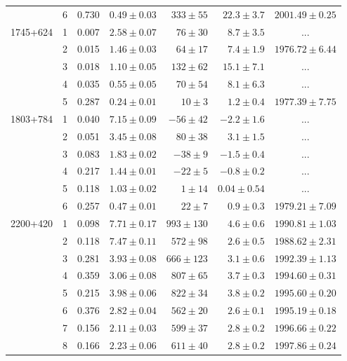 \begin{table}[tbh!]
\begin{SingleSpace}
\begin{tabular}{l c r r r r c}
         &  6 &  0.730 & $ 0.49\pm 0.03$ & $ 333\pm  55$ & $ 22.3\pm 3.7$ & $2001.49\pm   0.25$ \\
1745+624 &  1 &  0.007 & $ 2.58\pm 0.07$ & $  76\pm  30$ & $  8.7\pm 3.5$ & ... \\
         &  2 &  0.015 & $ 1.46\pm 0.03$ & $  64\pm  17$ & $  7.4\pm 1.9$ & $1976.72\pm   6.44$ \\
         &  3 &  0.018 & $ 1.10\pm 0.05$ & $ 132\pm  62$ & $ 15.1\pm 7.1$ & ... \\
         &  4 &  0.035 & $ 0.55\pm 0.05$ & $  70\pm  54$ & $  8.1\pm 6.3$ & ... \\
         &  5 &  0.287 & $ 0.24\pm 0.01$ & $  10\pm   3$ & $  1.2\pm 0.4$ & $1977.39\pm   7.75$ \\
1803+784 &  1 &  0.040 & $ 7.15\pm 0.09$ & $ -56\pm  42$ & $ -2.2\pm 1.6$ & ... \\
         &  2 &  0.051 & $ 3.45\pm 0.08$ & $  80\pm  38$ & $  3.1\pm 1.5$ & ... \\
         &  3 &  0.083 & $ 1.83\pm 0.02$ & $ -38\pm   9$ & $ -1.5\pm 0.4$ & ... \\
         &  4 &  0.217 & $ 1.44\pm 0.01$ & $ -22\pm   5$ & $ -0.8\pm 0.2$ & ... \\
         &  5 &  0.118 & $ 1.03\pm 0.02$ & $   1\pm  14$ & $  0.04\pm 0.54$ & ... \\
         &  6 &  0.257 & $ 0.47\pm 0.01$ & $  22\pm   7$ & $  0.9\pm 0.3$ & $1979.21\pm   7.09$ \\
2200+420 &  1 &  0.098 & $ 7.71\pm 0.17$ & $ 993\pm 130$ & $  4.6\pm 0.6$ & $1990.81\pm   1.03$ \\
         &  2 &  0.118 & $ 7.47\pm 0.11$ & $ 572\pm  98$ & $  2.6\pm 0.5$ & $1988.62\pm   2.31$ \\
         &  3 &  0.281 & $ 3.93\pm 0.08$ & $ 666\pm 123$ & $  3.1\pm 0.6$ & $1992.39\pm   1.13$ \\
         &  4 &  0.359 & $ 3.06\pm 0.08$ & $ 807\pm  65$ & $  3.7\pm 0.3$ & $1994.60\pm   0.31$ \\
         &  5 &  0.215 & $ 3.98\pm 0.06$ & $ 822\pm  34$ & $  3.8\pm 0.2$ & $1995.60\pm   0.20$ \\
         &  6 &  0.376 & $ 2.82\pm 0.04$ & $ 562\pm  20$ & $  2.6\pm 0.1$ & $1995.19\pm   0.18$ \\
         &  7 &  0.156 & $ 2.11\pm 0.03$ & $ 599\pm  37$ & $  2.8\pm 0.2$ & $1996.66\pm   0.22$ \\
         &  8 &  0.166 & $ 2.23\pm 0.06$ & $ 611\pm  40$ & $  2.8\pm 0.2$ & $1997.86\pm   0.24$ \\

\end{tabular}
\end{SingleSpace}
\end{table}
